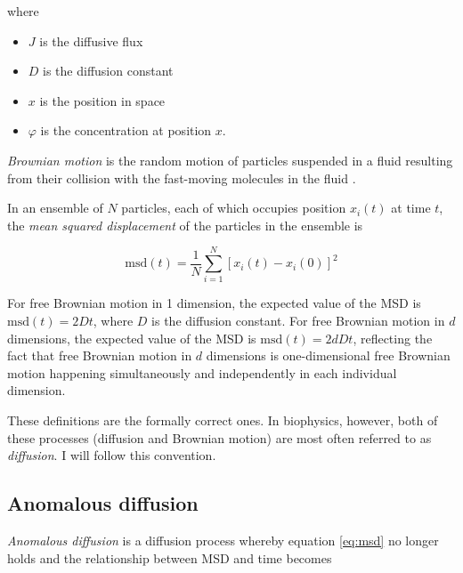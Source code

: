 \documentclass[12pt,]{book}
\providecommand{\tightlist}{%
  \setlength{\itemsep}{0pt}\setlength{\parskip}{0pt}}
\theoremstyle{definition}
\theoremstyle{definition}
\theoremstyle{definition}
\theoremstyle{remark}
\let\BeginKnitrBlock\begin \let\EndKnitrBlock\end
\begin{document}
where

\begin{itemize}
\tightlist
\item
  \(J\) is the diffusive flux
\item
  \(D\) is the diffusion constant
\item
  \(x\) is the position in space
\item
  \(\varphi\) is the concentration at position \(x\).
\end{itemize}

\BeginKnitrBlock{definition}
\protect\hypertarget{def:unnamed-chunk-11}{}{\label{def:unnamed-chunk-11}
}\emph{Brownian motion} is the random motion of particles suspended in a
fluid resulting from their collision with the fast-moving molecules in
the fluid \citep{Brownian}.
\EndKnitrBlock{definition}

\BeginKnitrBlock{definition}
\protect\hypertarget{def:unnamed-chunk-12}{}{\label{def:unnamed-chunk-12}
}In an ensemble of \(N\) particles, each of which occupies position
\(x_i(t)\) at time \(t\), the \emph{mean squared displacement} of the
particles in the ensemble is

\begin{equation}
\text{msd}(t) = \frac{1}{N}\sum_{i = 1}^N [x_i(t) - x_i(0)]^2
\label{eq:msd}
\end{equation}
\EndKnitrBlock{definition}

For free Brownian motion in 1 dimension, the expected value of the MSD
is \(\text{msd}(t) = 2Dt\), where \(D\) is the diffusion constant. For
free Brownian motion in \(d\) dimensions, the expected value of the MSD
is \(\text{msd}(t) = 2dDt\), reflecting the fact that free Brownian
motion in \(d\) dimensions is one-dimensional free Brownian motion
happening simultaneously and independently in each individual dimension.

These definitions are the formally correct ones. In biophysics, however,
both of these processes (diffusion and Brownian motion) are most often
referred to as \emph{diffusion}. I will follow this convention.

\subsection{Anomalous diffusion}\label{anomalous-diffusion}

\emph{Anomalous diffusion} is a diffusion process whereby equation
\eqref{eq:msd} no longer holds and the relationship between MSD and time
becomes
\end{document}
